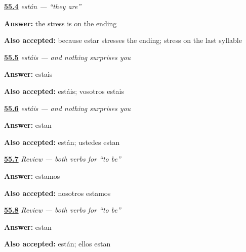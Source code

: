 \noindent\begin{minipage}[t]{\linewidth}
\raggedright
\hyperlink{review-ES-C09-estan-accent}{\textbf{55.4}} \emph{están — \textquotedblleft{}they are\textquotedblright{}}\par
\small \textbf{Answer:} the stress is on the ending\par
\footnotesize \textbf{Also accepted:} because estar stresses the ending; stress on the last syllable
\end{minipage}\par\medskip

\noindent\begin{minipage}[t]{\linewidth}
\raggedright
\hyperlink{review-ES-C09-estais-form}{\textbf{55.5}} \emph{estáis — and nothing surprises you}\par
\small \textbf{Answer:} estais\par
\footnotesize \textbf{Also accepted:} estáis; vosotros estais
\end{minipage}\par\medskip

\noindent\begin{minipage}[t]{\linewidth}
\raggedright
\hyperlink{review-ES-C09-estais-where}{\textbf{55.6}} \emph{estáis — and nothing surprises you}\par
\small \textbf{Answer:} estan\par
\footnotesize \textbf{Also accepted:} están; ustedes estan
\end{minipage}\par\medskip

\noindent\begin{minipage}[t]{\linewidth}
\raggedright
\hyperlink{review-ES-C09-repaso-ser-estar-we}{\textbf{55.7}} \emph{Review — both verbs for \textquotedblleft{}to be\textquotedblright{}}\par
\small \textbf{Answer:} estamos\par
\footnotesize \textbf{Also accepted:} nosotros estamos
\end{minipage}\par\medskip

\noindent\begin{minipage}[t]{\linewidth}
\raggedright
\hyperlink{review-ES-C09-repaso-ser-estar-they}{\textbf{55.8}} \emph{Review — both verbs for \textquotedblleft{}to be\textquotedblright{}}\par
\small \textbf{Answer:} estan\par
\footnotesize \textbf{Also accepted:} están; ellos estan
\end{minipage}\par\medskip

